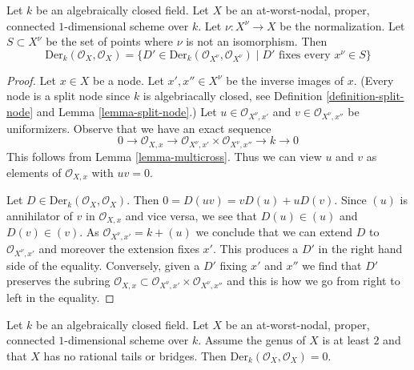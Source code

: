 \begin{lemma}
\label{lemma-nodal-vector-fields}
Let $k$ be an algebraically closed field.
Let $X$ be an at-worst-nodal, proper, connected
$1$-dimensional scheme over $k$. Let $\nu : X^\nu \to X$ be the normalization.
Let $S \subset X^\nu$ be the set of points where $\nu$ is not an
isomorphism. Then
$$
\text{Der}_k(\mathcal{O}_X, \mathcal{O}_X) =
\{D' \in \text{Der}_k(\mathcal{O}_{X^\nu}, \mathcal{O}_{X^\nu}) \mid
D' \text{ fixes every }x^\nu \in S\}
$$
\end{lemma}

\begin{proof}
Let $x \in X$ be a node. Let $x', x'' \in X^\nu$ be the inverse images
of $x$. (Every node is a split node since $k$ is algebriacally closed, see
Definition \ref{definition-split-node} and
Lemma \ref{lemma-split-node}.)
Let $u \in \mathcal{O}_{X^\nu, x'}$ and $v \in \mathcal{O}_{X^\nu, x''}$
be uniformizers. Observe that we have an exact sequence
$$
0 \to \mathcal{O}_{X, x} \to
\mathcal{O}_{X^\nu, x'} \times \mathcal{O}_{X^\nu, x''} \to k \to 0
$$
This follows from Lemma \ref{lemma-multicross}.
Thus we can view $u$ and $v$ as elements of $\mathcal{O}_{X, x}$
with $uv = 0$.

\medskip\noindent
Let $D \in \text{Der}_k(\mathcal{O}_X, \mathcal{O}_X)$. Then
$0 = D(uv) = vD(u) + uD(v)$. Since $(u)$ is annihilator of
$v$ in $\mathcal{O}_{X, x}$ and vice versa, we see that $D(u) \in (u)$ and
$D(v) \in (v)$. As $\mathcal{O}_{X^\nu, x'} = k + (u)$
we conclude that we can extend $D$ to $\mathcal{O}_{X^\nu, x'}$
and moreover the extension fixes $x'$. This produces a $D'$
in the right hand side of the equality. Conversely, given a
$D'$ fixing $x'$ and $x''$ we find that $D'$ preserves
the subring $\mathcal{O}_{X, x} \subset
\mathcal{O}_{X^\nu, x'} \times \mathcal{O}_{X^\nu, x''}$
and this is how we go from right to left in the equality.
\end{proof}

\begin{lemma}
\label{lemma-stable-vector-fields}
Let $k$ be an algebraically closed field.
Let $X$ be an at-worst-nodal, proper, connected
$1$-dimensional scheme over $k$. Assume the genus of $X$ is at least
$2$ and that $X$ has no rational tails
or bridges. Then
$\text{Der}_k(\mathcal{O}_X, \mathcal{O}_X) = 0$.
\end{lemma}

